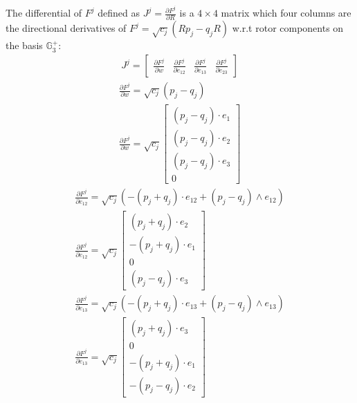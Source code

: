 \documentclass{birkjour}
\numberwithin{equation}{section}
\begin{document}


The differential of $F^j$ defined as $J^j = \frac{\partial F^j}{\partial R}$ is a $4\times4$ matrix which four columns are the directional derivatives of $F^j = \sqrt{c_j} (R p_j - q_j R)$ w.r.t rotor components on the basis $\mathbb{G}^{+}_3$:
\begin{eqnarray*}
J^j = \left[\begin{array}{cccc}\frac{\partial F^j}{\partial w} & \frac{\partial F^j}{\partial e_{12}} & \frac{\partial F^j}{\partial e_{13}} & \frac{\partial F^j}{\partial e_{23}}\end{array}\right]
\end{eqnarray*}
\begin{eqnarray*}
\frac{\partial F^j}{\partial w} = \sqrt{c_j} (p_j - q_j)\\
\frac{\partial F^j}{\partial w} = \sqrt{c_j}
\left[\begin{array}{c}(p_j - q_j) \cdot e_1 \\ (p_j - q_j) \cdot e_2 \\ (p_j - q_j) \cdot e_3 \\ 0\end{array}\right]
\end{eqnarray*}
\begin{eqnarray*}
\frac{\partial F^j}{\partial e_{12}} = \sqrt{c_j} (-(p_j+q_j) \cdot e_{12} + (p_j-q_j) \wedge e_{12})\\
\frac{\partial F^j}{\partial e_{12}} = \sqrt{c_j}
\left[\begin{array}{c}(p_j + q_j) \cdot e_2 \\ -(p_j + q_j) \cdot e_1 \\ 0 \\ (p_j - q_j) \cdot e_3\end{array}\right]
\end{eqnarray*}
\begin{eqnarray*}
\frac{\partial F^j}{\partial e_{13}} = \sqrt{c_j} (-(p_j  + q_j) \cdot e_{13} + (p_j - q_j) \wedge e_{13})\\
\frac{\partial F^j}{\partial e_{13}} = \sqrt{c_j}
\left[\begin{array}{c}(p_j  + q_j) \cdot e_3 \\ 0 \\ -(p_j  + q_j) \cdot e_1 \\ -(p_j - q_j) \cdot e_2\end{array}\right]
\end{eqnarray*}
\end{document}
